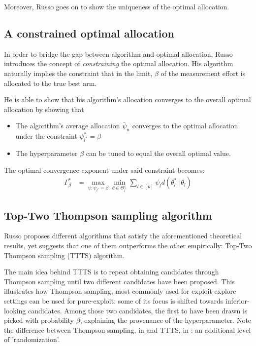 Moreover, Russo goes on to show the uniqueness of the optimal allocation.

\subsection{A constrained optimal allocation}

In order to bridge the gap between algorithm and optimal allocation, Russo
introduces the concept of \emph{constraining} the optimal allocation. His
algorithm naturally implies the constraint that in the limit, $\beta$ of the
measurement effort is allocated to the true best arm.

He is able to show that his algorithm's allocation converges to the overall
optimal allocation by showing that
\begin{itemize}
  \item The algorithm's average allocation $\bar{\psi}_n$ converges to the
  optimal allocation under the constraint $\psi_{l^*}^* = \beta$
  \item The hyperparameter $\beta$ can be tuned to equal the overall optimal
  value.
\end{itemize}
The optimal convergence exponent under said constraint becomes:
\begin{align}
  \Gamma^*_{\beta} &= \max_{\psi: \psi_{l^*} = \beta} \min_{\theta \in
      \Theta^c_{l^*}} \sum_{l \in [k]} \psi_l d(\theta_l^* || \theta_l)
\end{align}

\subsection{Top-Two Thompson sampling algorithm}

Russo proposes different algorithms that satisfy the aforementioned theoretical
results, yet suggests that one of them outperforms the other empirically:
Top-Two Thompson sampling (TTTS) algorithm.

The main idea behind TTTS is to repeat obtaining candidates through Thompson
sampling until two different candidates have been proposed. This illustrates how
Thompson sampling, most commonly used for exploit-explore settings can be used
for pure-exploit: some of its focus is shifted towards inferior-looking
candidates. Among those two candidates, the first to have been drawn is picked
with probability $\beta$, explaining the provenance of the hyperparameter. Note
the difference between Thompson sampling, in  and
TTTS, in : an additional level of 'randomization'.

